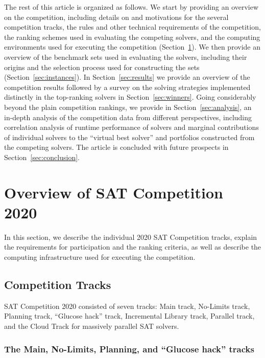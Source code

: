 \documentclass{elsarticle}
\begin{document}
The rest of this article is organized as follows. 
We start by providing an overview on the competition, including details on and motivations for the several
competition tracks, the rules and other technical requirements of the competition, the ranking schemes used
in evaluating the competing solvers, 
and the computing environments used for executing the competition
(Section~\ref{sec:overview}).
We then provide an overview of the benchmark sets used in evaluating the solvers, including their origins and the selection
process used for constructing the sets (Section~\ref{sec:instances}).
In Section~\ref{sec:results} we provide an overview of the competition results %
followed by a survey on 
the solving strategies implemented distinctly in the top-ranking solvers in Section~\ref{sec:winners}. 
Going considerably beyond the plain competition rankings, we provide in Section~\ref{sec:analysis}, an in-depth analysis of the competition 
data from different perspectives, including correlation analysis of runtime performance of solvers and marginal contributions
of individual solvers to the ``virtual best solver'' and 
portfolios constructed from the competing solvers.
The article is concluded with future prospects in Section~\ref{sec:conclusion}.


\section{Overview of SAT Competition 2020}
\label{sec:overview}

In this section, we describe the individual 2020 SAT Competition tracks,
explain the requirements for participation %
and the ranking criteria, as well as describe
the computing infrastructure used for executing the competition.

\subsection{Competition Tracks}

SAT Competition 2020 consisted of seven tracks:
Main track, No-Limits track, Planning track, ``Glucose hack'' track,
Incremental Library track, Parallel track,
and the Cloud Track for massively parallel SAT solvers. %

\subsubsection{The Main, No-Limits, Planning, and ``Glucose hack'' tracks}
\end{document}
